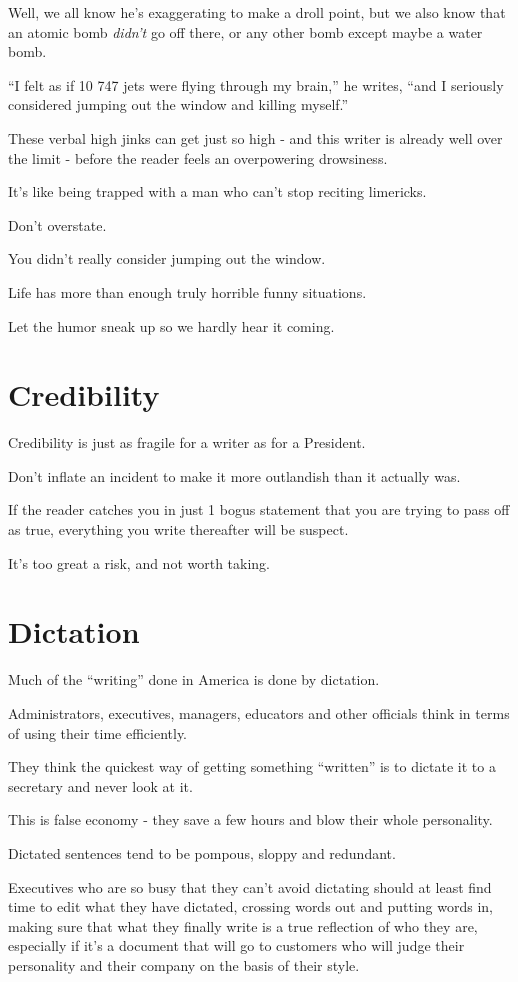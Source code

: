 \documentclass{book}
\numberwithin{equation}{section}
\begin{document}
Well, we all know he's exaggerating to make a droll point, but we also know that an atomic bomb \textit{didn't} go off there, or any other bomb except maybe a water bomb.

``I felt as if 10 747 jets were flying through my brain,'' he writes, ``and I seriously considered jumping out the window and killing myself.''

These verbal high jinks can get just so high - and this writer is already well over the limit - before the reader feels an overpowering drowsiness.

It's like being trapped with a man who can't stop reciting limericks.

Don't overstate.

You didn't really consider jumping out the window.

Life has more than enough truly horrible funny situations.

Let the humor sneak up so we hardly hear it coming.

\section{Credibility}
Credibility is just as fragile for a writer as for a President.

Don't inflate an incident to make it more outlandish than it actually was.

If the reader catches you in just 1 bogus statement that you are trying to pass off as true, everything you write thereafter will be suspect.

It's too great a risk, and not worth taking.

\section{Dictation}
Much of the ``writing'' done in America is done by dictation.

Administrators, executives, managers, educators and other officials think in terms of using their time efficiently.

They think the quickest way of getting something ``written'' is to dictate it to a secretary and never look at it.

This is false economy - they save a few hours and blow their whole personality.

Dictated sentences tend to be pompous, sloppy and redundant.

Executives who are so busy that they can't avoid dictating should at least find time to edit what they have dictated, crossing words out and putting words in, making sure that what they finally write is a true reflection of who they are, especially if it's a document that will go to customers who will judge their personality and their company on the basis of their style.
\end{document}
